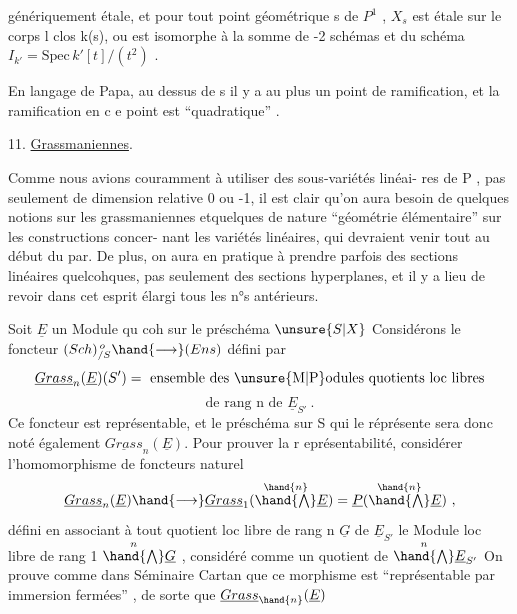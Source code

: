 
génériquement étale, et pour tout point géométrique  s de $P^1$ ,  $X_s$
est étale sur le corps \margin{\unsure{$-$}}l clos  k(s), ou   est
isomorphe à la somme de -2  schémas    et   du schéma  
$I_{k'} = \mathrm{Spec}\, k'[t]/(t^2)$ .

En langage de Papa, au  dessus de s  il y a au plus un point de
ramification, et la ramification en c e point est ``quadratique'' .

11.  \uline{Grassmaniennes}.\margin{\unsure{$\prime\,\prime$}}\margin{\unsure{$\smile\,\smile$}} 

Comme nous avions couramment à utiliser des sous-variétés linéai-%
res de P , pas seulement de dimension relative 0 ou -1, il est clair
qu'on aura besoin de quelques notions sur les grassmaniennes  etquelques
 de nature ``géométrie élémentaire'' sur les constructions concer-%
nant les variétés linéaires, qui  devraient venir tout au début du par.
De plus, on aura en pratique à prendre parfois des sections linéaires
quelcohques, pas seulement des sections hyperplanes, et il y a lieu de
revoir dans cet esprit élargi tous les n°s antérieurs.

Soit  $\underline{E}$  un Module qu coh  sur le préschéma $\unsure{S|X}$ Considérons le
foncteur \qquad $(Sch)_{/S}^{\,o} \hand{\longrightarrow} (Ens)$  défini par
\[ \underline{Grass}_n(\underline{E})(S') = \text{ ensemble des \unsure{M|P}odules quotients loc libres} \]
\[ \text{de rang  n  de } \underline{E}_{S'} \ . \]
Ce foncteur est représentable, et le préschéma sur S qui le réprésente
sera donc noté également $\underline{Grass}_n(\underline{E})$.  Pour prouver la r eprésentabilité,
considérer l'homomorphisme de foncteurs naturel
\[ \underline{Grass}_n(\underline{E}) \hand{\longrightarrow} \underline{Grass}_1( \overset{\hand{n}}{\textstyle\hand{\bigwedge}} \underline{E} ) = \underline{P} ( \overset{\hand{n}}{\textstyle\hand{\bigwedge}} \underline{E}) \ , \]
défini en associant à  tout  quotient loc libre  de rang n  $\underline{G}$  de $\underline{E}_{S'}$
le Module  loc libre de rang 1 \quad $\overset{n}{\textstyle\hand{\bigwedge}} \underline{G}$ , considéré comme un quotient
de  $\overset{n}{\textstyle\hand{\bigwedge}} \underline{E}_{S'}$   On prouve comme dans  Séminaire Cartan que  ce morphisme
est  ``représentable par  immersion fermées'' , de sorte que $\underline{Grass}_{\hand{n}}(\underline{E})$

